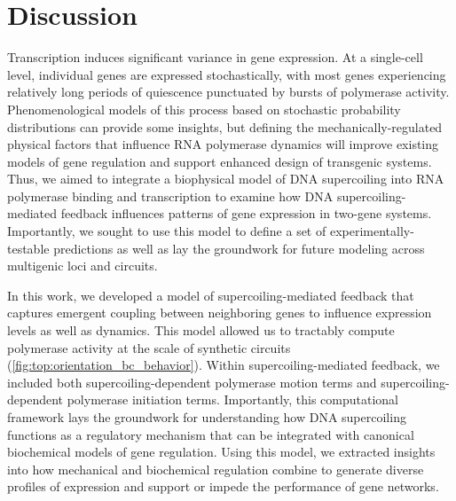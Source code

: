 \documentclass[11pt]{article}
\begin{document}
\section{Discussion}
Transcription induces significant variance in gene expression. At a single-cell level, individual genes are expressed stochastically, with most genes experiencing relatively long periods of quiescence punctuated by bursts of polymerase activity. Phenomenological models of this process based on stochastic probability distributions can provide some insights, but defining the mechanically-regulated physical factors that influence RNA polymerase dynamics  will improve existing models of gene regulation and support enhanced design of transgenic systems. Thus, we aimed to integrate a biophysical model of DNA supercoiling into RNA polymerase binding and transcription to examine how DNA supercoiling-mediated feedback influences patterns of gene expression in two-gene systems. Importantly, we sought to use this model to define a set of experimentally-testable predictions as well as lay the groundwork for future modeling across multigenic loci and circuits. 
 
In this work, we developed a model of supercoiling-mediated feedback that captures emergent coupling between neighboring genes to influence expression levels as well as dynamics. This model allowed us to tractably compute polymerase activity at the scale of synthetic circuits (\cref{fig:top:orientation_bc_behavior}). Within supercoiling-mediated feedback, we included both supercoiling-dependent polymerase motion terms and supercoiling-dependent polymerase initiation terms. Importantly, this computational framework lays the groundwork for understanding how DNA supercoiling functions as a regulatory mechanism that can be integrated with canonical biochemical models of gene regulation. Using this model, we extracted insights into how mechanical and biochemical regulation combine to generate diverse profiles of expression and support or impede the performance of gene networks.
\end{document}
